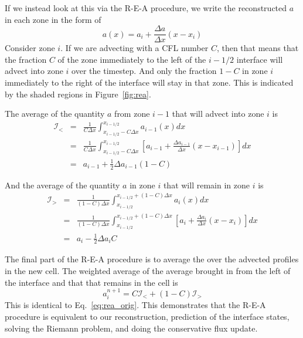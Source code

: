 \documentclass[11pt]{article}
\begin{document}
If we instead look at this via the R-E-A procedure, we write the reconstructed
$a$ in each zone in the form of 
\begin{equation}
a(x) = a_i + \frac{\Delta a}{\Delta x} (x - x_i)
\end{equation}
Consider zone $i$.  
If we are advecting with a CFL number $C$, then that means that the fraction
$C$ of the zone immediately to the left of the $i-1/2$ interface will advect
into zone $i$ over the timestep.  And only the fraction $1-C$ in zone $i$
immediately to the right of the interface will stay in that zone.  This 
is indicated by the shaded regions in Figure~\ref{fig:rea}. 

The average of the quantity $a$ from zone $i-1$ that will advect into
zone $i$ is 
\begin{eqnarray}
\mathcal{I}_< &=& \frac{1}{C \Delta x} 
   \int_{x_{i-1/2} - C\Delta x}^{x_{i-1/2}} a_{i-1}(x) dx \\
%
 &=& \frac{1}{C \Delta x} 
   \int_{x_{i-1/2} - C\Delta x}^{x_{i-1/2}}
        \left [ a_{i-1} + \frac{\Delta a_{i-1}}{\Delta x} (x - x_{i-1} ) \right ] dx  \\
 &=& a_{i-1} + \frac{1}{2} \Delta a_{i-1} (1-C)
\end{eqnarray}

And the average of the quantity $a$ in zone $i$ that will remain in zone $i$
is
\begin{eqnarray}
\mathcal{I}_> &=& \frac{1}{(1-C) \Delta x} 
   \int_{x_{i-1/2}}^{x_{i-1/2} + (1-C) \Delta x} a_{i}(x) dx \\
%
 &=& \frac{1}{(1-C) \Delta x} 
   \int_{x_{i-1/2}}^{x_{i-1/2} + (1-C)\Delta x} 
        \left [ a_{i} + \frac{\Delta a_{i}}{\Delta x} (x - x_{i} ) \right ] dx  \\
 &=& a_{i} - \frac{1}{2} \Delta a_{i} C
\end{eqnarray}

The final part of the R-E-A procedure is to average the over the 
advected profiles in the new cell.  The weighted average of the
average brought in from the left of the interface and that that remains
in the cell is
\begin{equation}
a_i^{n+1} = C \mathcal{I}_< + (1 - C) \mathcal{I}_> 
\end{equation}          
This is identical to Eq.~\ref{eq:rea_orig}.  This demonstrates that the
R-E-A procedure is equivalent to our reconstruction, prediction of the
interface states, solving the Riemann problem, and doing the 
conservative flux update.
\end{document}
